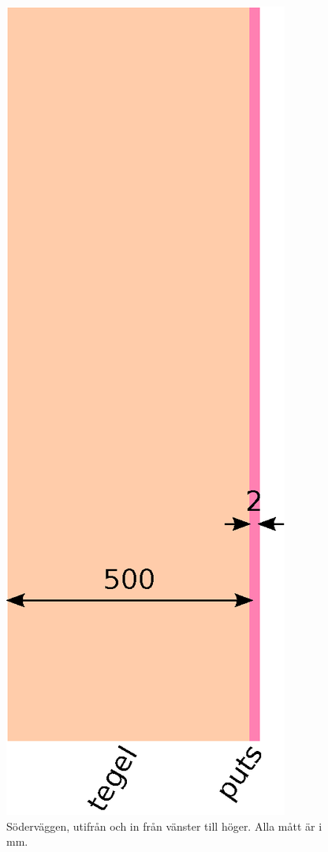 \begin{figure}[hpbt]
\centering
\includegraphics[height=0.4\textheight]{images/sodervagg.eps}
\caption{\label{fig:sodervagg}{Söderväggen, utifrån och in från vänster till höger. Alla mått är i mm.}}
\end{figure}

